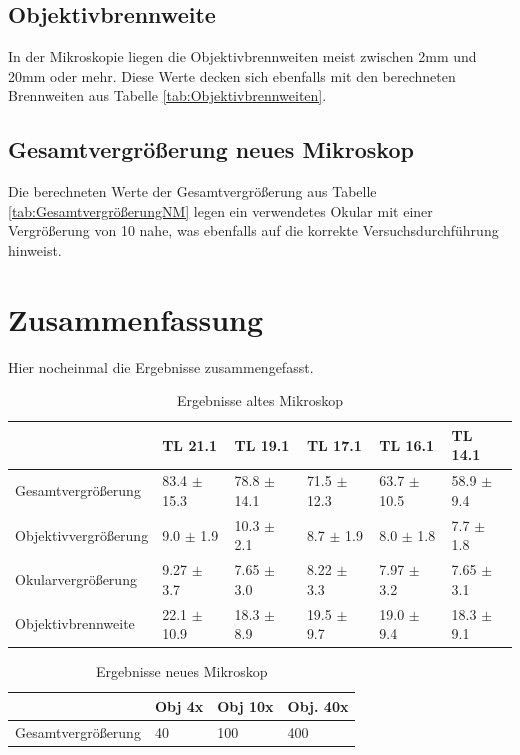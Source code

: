 \documentclass[12pt,a4paper,twoside]{article}
\begin{document}
\subsection{Objektivbrennweite}

In der Mikroskopie liegen die Objektivbrennweiten meist zwischen 2mm und 20mm oder mehr. Diese Werte decken sich ebenfalls mit den berechneten Brennweiten aus Tabelle \ref{tab:Objektivbrennweiten}.


\subsection{Gesamtvergrößerung neues Mikroskop}

Die berechneten Werte der Gesamtvergrößerung aus Tabelle \ref{tab:GesamtvergrößerungNM} legen ein verwendetes Okular mit einer Vergrößerung von 10 nahe, was ebenfalls auf die korrekte Versuchsdurchführung hinweist.


\section{Zusammenfassung} %

Hier nocheinmal die Ergebnisse zusammengefasst.

\begin{table}[H]
    \centering
    \caption{Ergebnisse altes Mikroskop}
    \label{tab:ErgebnisseAM}
    \begin{tabular}{| l | l | l | l | l | l |}
        \hline
         & TL 21.1 & TL 19.1 & TL 17.1 & TL 16.1 & TL 14.1 \\
        \hline
        Gesamtvergrößerung & 83.4 $\pm$ 15.3 & 78.8 $\pm$ 14.1 & 71.5 $\pm$ 12.3 & 63.7 $\pm$ 10.5 & 58.9 $\pm$ 9.4 \\
        Objektivvergrößerung & 9.0 $\pm$ 1.9 & 10.3 $\pm$ 2.1 & 8.7 $\pm$ 1.9 & 8.0 $\pm$ 1.8 & 7.7 $\pm$ 1.8 \\
        Okularvergrößerung & 9.27 $\pm$ 3.7 & 7.65 $\pm$ 3.0 & 8.22 $\pm$ 3.3 & 7.97 $\pm$ 3.2 & 7.65 $\pm$ 3.1 \\
        Objektivbrennweite & 22.1 $\pm$ 10.9 & 18.3 $\pm$ 8.9 & 19.5 $\pm$ 9.7 & 19.0 $\pm$ 9.4 & 18.3 $\pm$ 9.1 \\
        \hline
    \end{tabular}
\end{table}

\begin{table}[H]
    \centering
    \caption{Ergebnisse neues Mikroskop}
    \label{tab:ErgebnisseNM}
    \begin{tabular}{| l | l | l | l |}
        \hline
         & Obj 4x & Obj 10x & Obj. 40x \\
        \hline
        Gesamtvergrößerung & 40 & 100 & 400 \\
        \hline
    \end{tabular}
\end{table}
\end{document}
